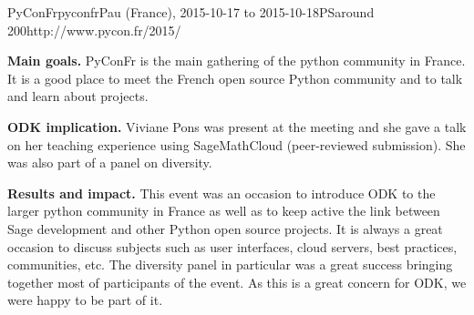 \begin{event}{PyConFr}{pyconfr}{Pau (France), 2015-10-17 to 2015-10-18}{PS}{around 200}{http://www.pycon.fr/2015/}

\textbf{Main goals.} PyConFr is the main gathering of the python community in France. It is a good place to meet the 
French open source Python community and to talk and learn about projects.

\textbf{ODK implication.} Viviane Pons was present at the meeting and she gave a talk
on her teaching experience using SageMathCloud \cite{15PonsSMC} (peer-reviewed submission). She was
also part of a panel on diversity. 

\textbf{Results and impact.} This event was an occasion to introduce ODK to the larger python community in France as well as to
keep active the link between Sage development and other Python open source projects. It is always a great occasion to discuss subjects
 such as user interfaces, cloud servers, best practices, communities, etc. The diversity panel in particular was a great success bringing
 together most of participants of the event. As this is a great concern for ODK, we were happy to be part of it.
\end{event}